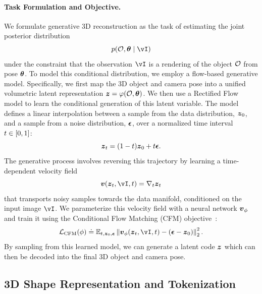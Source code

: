 \documentclass[../../book-main.tex]{subfiles}
\begin{document}
\paragraph{Task Formulation and Objective.}
We formulate generative 3D reconstruction as the task of estimating
the joint posterior distribution
\[
p(\object, \pose \mid \image)
\]
under the constraint that the observation $\image$ is a rendering of
the object $\mathcal{O}$ from pose $\boldsymbol{\theta}$. To model this conditional
distribution, we employ a flow-based generative model. Specifically,
we first map the 3D object and camera pose into a unified volumetric
latent representation
\(\boldsymbol{z} = \varphi(\mathcal{O}, \boldsymbol{\theta})\).
We then use a Rectified Flow~\citep{lipmanflow} model to learn the conditional
generation of this latent variable. The model defines a linear
interpolation between a sample from the data distribution,
$\boldsymbol{z}_{0}$, and a sample from a noise distribution, $\boldsymbol{\epsilon}$, over
a normalized time interval $t \in [0,1]$:
\begin{equation}
\boldsymbol{z}_{t} = (1 - t) \boldsymbol{z}_{0} + t \boldsymbol{\epsilon}.
\end{equation}
The generative process involves reversing this trajectory by learning
a time-dependent velocity field
\[
\velocity(\latentt, \image, \timestep) = \nabla_{\timestep} \latentt
\]
that transports noisy samples towards the data manifold, conditioned
on the input image $\image$. We parameterize this velocity field with
a neural network $\boldsymbol{v}_{\phi}$ and train it using the
Conditional Flow Matching (CFM) objective~\cite{lipmanflow}:
\begin{equation}
\mathcal{L}_{\mathrm{CFM}}(\parameter) \doteq \mathbb{E}_{\timestep,
\latentzero, \noise} \left\| \velocity_{\parameter}(\latentt, \image,
\timestep) - (\noise - \latentzero) \right\|_{2}^{2}.
\end{equation}
By sampling from this learned model, we can generate a latent code
$\boldsymbol{z}$ which can then be decoded into the final 3D object and camera pose.

\subsection{3D Shape Representation and Tokenization}
\end{document}
